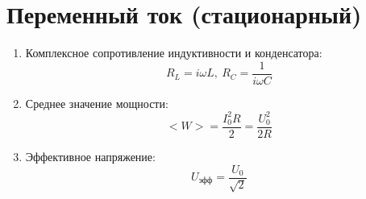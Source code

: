 		
	
	\section{Переменный ток (стационарный)}
	\begin{enumerate}
		\item Комплексное сопротивление индуктивности и конденсатора: \[ R_L = i \omega L, \ R_C = \frac{1}{i \omega C} \]
		\item Среднее значение мощности: \[ <W> = \frac{I_0^2 R}{2} = \frac{U_0^2}{2R} \]
		\item Эффективное напряжение: \[ U_{\text{эфф}} = \frac{U_0}{\sqrt{2}}\]
	\end{enumerate}
	
